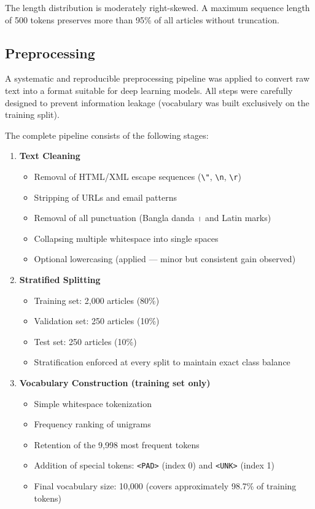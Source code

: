 \documentclass[pdflatex,sn-mathphys-num]{sn-jnl}
\theoremstyle{thmstyleone}\newtheorem{theorem}{Theorem}
\theoremstyle{thmstyletwo}\newtheorem{example}{Example}\newtheorem{remark}{Remark}
\theoremstyle{thmstylethree}\newtheorem{definition}{Definition}
\begin{document}
The length distribution is moderately right-skewed. A maximum sequence length of 500 tokens preserves more than 95\% of all articles without truncation.

\subsection{Preprocessing}
\label{subsec:preprocessing}

A systematic and reproducible preprocessing pipeline was applied to convert raw text into a format suitable for deep learning models. All steps were carefully designed to prevent information leakage (vocabulary was built exclusively on the training split).

The complete pipeline consists of the following stages:

\begin{enumerate}
    \item \textbf{Text Cleaning}
    \begin{itemize}
        \item Removal of HTML/XML escape sequences (\texttt{\textbackslash"}, \texttt{\textbackslash n}, \texttt{\textbackslash r})
        \item Stripping of URLs and email patterns
        \item Removal of all punctuation (Bangla danda \texttt{।} and Latin marks)
        \item Collapsing multiple whitespace into single spaces
        \item Optional lowercasing (applied — minor but consistent gain observed)
    \end{itemize}

    \item \textbf{Stratified Splitting}
    \begin{itemize}
        \item Training set: 2,000 articles (80\%)
        \item Validation set: 250 articles (10\%)
        \item Test set: 250 articles (10\%)
        \item Stratification enforced at every split to maintain exact class balance
    \end{itemize}

    \item \textbf{Vocabulary Construction (training set only)}
    \begin{itemize}
        \item Simple whitespace tokenization
        \item Frequency ranking of unigrams
        \item Retention of the 9,998 most frequent tokens
        \item Addition of special tokens: \texttt{<PAD>} (index 0) and \texttt{<UNK>} (index 1)
        \item Final vocabulary size: 10,000 (covers approximately 98.7\% of training tokens)
    \end{itemize}


\end{enumerate}
\end{document}

